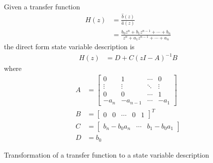 \documentclass[a4paper,twoside,10pt,english]{report}
\begin{document}
\begin{algorithm}[!tbph]
Given a transfer function
\begin{align*}
H\left(z\right) &= \frac{\hat{b}\left(z\right)}{\hat{a}\left(z\right)}\\
&= \frac{b_{0}z^{n}+b_{1}z^{n-1}+\cdots+b_{n}}{z^{n}+a_{1}z^{n-1}+\cdots+a_{n}}
\end{align*}
the direct form state variable description is
\begin{align*}
H\left(z\right) &= D+C(zI-A)^{-1}B
\end{align*}
where
\begin{align*}
A &= \left[\begin{array}{cccc}
0 & 1 & \cdots & 0\\
\vdots & \vdots & \ddots & \vdots\\
0 & 0 & \cdots & 1\\
-a_{n} & -a_{n-1} & \cdots & -a_{1}
\end{array}\right]\\
B &= \left[\begin{array}{ccccc}
0 & 0 & \cdots & 0 & 1\end{array}\right]^{T}\\
C &= \left[\begin{array}{ccc}
b_{n}-b_{0}a_{n} & \cdots & b_{1}-b_{0}a_{1}\end{array}\right]\\
D &= b_{0}
\end{align*}
\caption{Transformation of a transfer function to a state variable description}
\label{alg:Transformation-transfer-to-SV}
\end{algorithm}
\end{document}
